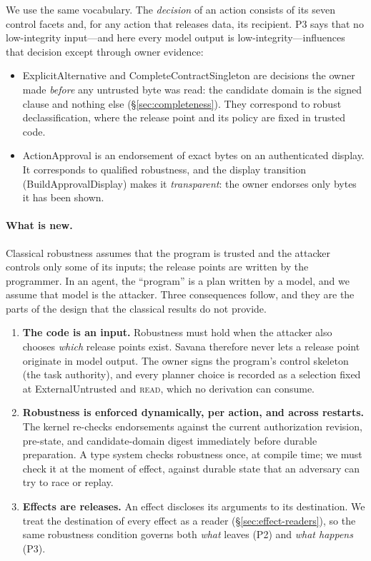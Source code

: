 \documentclass[letterpaper,twocolumn,10pt]{article}
\newcommand{\sys}{Savana}
\newcommand{\READ}{\textsc{read}}
\begin{document}
We use the same vocabulary. The \emph{decision} of an action consists of
its seven control facets and, for any action that releases data, its
recipient. P3 says that no low-integrity input---and here every model output
is low-integrity---influences that decision except through owner evidence:
\begin{itemize}
\item \textsf{ExplicitAlternative} and \textsf{CompleteContractSingleton} are
  decisions the owner made \emph{before} any untrusted byte was read: the
  candidate domain is the signed clause and nothing else
  (\S\ref{sec:completeness}). They correspond to robust declassification,
  where the release point and its policy are fixed in trusted code.
\item \textsf{ActionApproval} is an endorsement of exact bytes on an
  authenticated display. It corresponds to qualified robustness, and the
  display transition (\textsf{BuildApprovalDisplay}) makes it
  \emph{transparent}: the owner endorses only bytes it has been shown.
\end{itemize}

\paragraph{What is new.} Classical robustness assumes that the program is
trusted and the attacker controls only some of its inputs; the release
points are written by the programmer. In an agent, the ``program'' is a
plan written by a model, and we assume that model is the attacker. Three
consequences follow, and they are the parts of the design that the
classical results do not provide.
\begin{enumerate}
\item \textbf{The code is an input.} Robustness must hold when the
  attacker also chooses \emph{which} release points exist. \sys{} therefore
  never lets a release point originate in model output. The owner signs
  the program's control skeleton (the task authority), and every planner
  choice is recorded as a selection fixed at \textsf{ExternalUntrusted}
  and \READ, which no derivation can consume.
\item \textbf{Robustness is enforced dynamically, per action, and across
  restarts.} The kernel re-checks endorsements against the current
  authorization revision, pre-state, and candidate-domain digest
  immediately before durable preparation. A type system checks robustness
  once, at compile time; we must check it at the moment of effect, against
  durable state that an adversary can try to race or replay.
\item \textbf{Effects are releases.} An effect discloses its arguments to
  its destination. We treat the destination of every effect as a reader
  (\S\ref{sec:effect-readers}), so the same robustness condition governs
  both \emph{what} leaves (P2) and \emph{what happens} (P3).
\end{enumerate}
\end{document}
